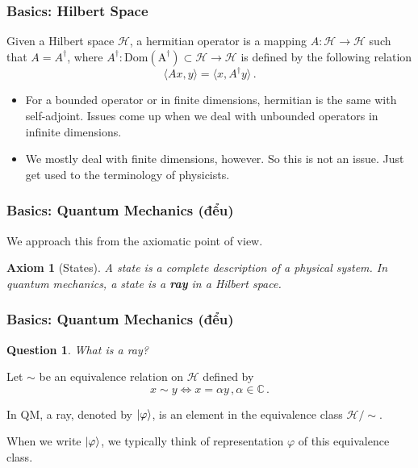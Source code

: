 \documentclass[12pt]{beamer}
\newtheorem{axiom}{Axiom}
\newtheorem*{question}{Question}
\begin{document}
\begin{frame}
    \frametitle{ Basics: Hilbert Space}
    \begin{definition}
        Given a Hilbert space $\mathcal{H}$,
        a hermitian operator is a mapping $A:\mathcal{H} \to \mathcal{H}$ such that
        $A = A^\dag$, where $A^\dag: \mathrm{Dom(A^\dag)}\subset \mathcal{H} \to \mathcal{H}$ is defined by the following relation
        \begin{equation*}
            \langle A x , y \rangle = \langle x , A^\dag y \rangle \,.
        \end{equation*}
    \end{definition}
    \begin{itemize}
        \item For a bounded operator or in finite dimensions, hermitian is the same with self-adjoint.
    Issues come up when we deal with unbounded operators in  infinite dimensions.
        \item We mostly deal with finite dimensions, however. So this is not an issue. Just get used
    to the terminology of physicists.
    \end{itemize}

\end{frame}

\begin{frame}
\frametitle{Basics: Quantum Mechanics \pause (đểu)}
We approach this from the axiomatic point of view. 

\begin{axiom}[States]
    A state is a complete description of a physical system. 
    In quantum mechanics, a state is a {\bf ray} in a Hilbert space.
\end{axiom}

    
\end{frame}

\begin{frame}
\frametitle{Basics: Quantum Mechanics (đểu)}
\begin{question}
What is a ray?
\end{question}

Let $\sim$ be an equivalence relation on $\mathcal{H}$ defined by
\begin{equation*}
    x\sim y \iff x = \alpha y\,, \alpha \in \mathbb{C}\,.
\end{equation*}

In QM, a ray, denoted by $\ket{\varphi}$, is an element in the equivalence class $\mathcal{H}/\sim$.

    When we write $\ket{\varphi}$, we typically think of representation $\varphi$ of this equivalence class.
\end{frame}
\end{document}
